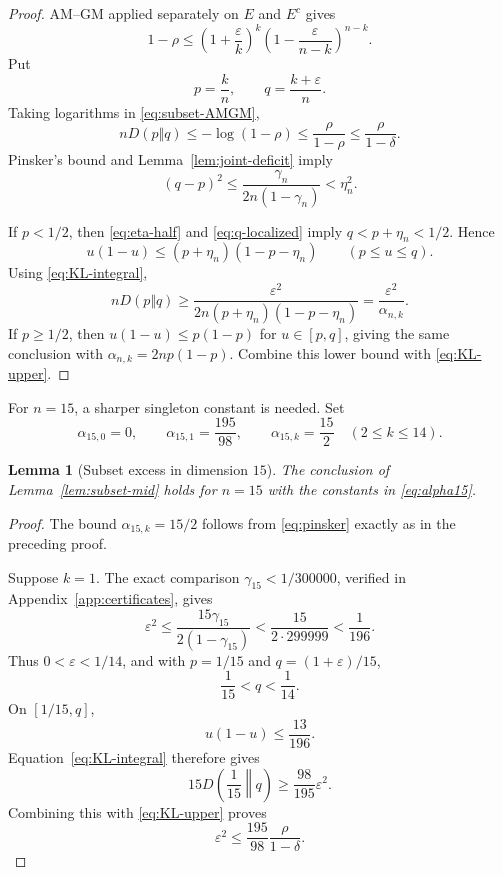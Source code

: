 \documentclass[11pt,a4paper]{article}
\numberwithin{equation}{section}
\newtheorem{lemma}[theorem]{Lemma}
\theoremstyle{definition}
\newcommand{\1}{\mathbf{1}}
\newcommand{\eps}{\varepsilon}
\begin{document}
\begin{proof}
AM--GM applied separately on $E$ and $E^c$ gives
\begin{equation}\label{eq:subset-AMGM}
 1-\rho
 \le
 \left(1+\frac{\eps}{k}\right)^k
 \left(1-\frac{\eps}{n-k}\right)^{n-k}.
\end{equation}
Put
\[
 p=\frac{k}{n},
 \qquad
 q=\frac{k+\eps}{n}.
\]
Taking logarithms in \eqref{eq:subset-AMGM},
\begin{equation}\label{eq:KL-upper}
 nD(p\Vert q)\le-\log(1-\rho)
 \le\frac{\rho}{1-\rho}
 \le\frac{\rho}{1-\delta}.
\end{equation}
Pinsker's bound and Lemma~\ref{lem:joint-deficit} imply
\begin{equation}\label{eq:q-localized}
 (q-p)^2
 \le\frac{\gamma_n}{2n(1-\gamma_n)}
 <\eta_n^2.
\end{equation}

If $p<1/2$, then \eqref{eq:eta-half} and \eqref{eq:q-localized} imply $q<p+\eta_n<1/2$.  Hence
\[
 u(1-u)\le(p+\eta_n)(1-p-\eta_n)
 \qquad(p\le u\le q).
\]
Using \eqref{eq:KL-integral},
\[
 nD(p\Vert q)
 \ge\frac{\eps^2}
 {2n(p+\eta_n)(1-p-\eta_n)}
 =\frac{\eps^2}{\alpha_{n,k}}.
\]
If $p\ge1/2$, then $u(1-u)\le p(1-p)$ for $u\in[p,q]$, giving the same conclusion with $\alpha_{n,k}=2np(1-p)$.  Combine this lower bound with \eqref{eq:KL-upper}.
\end{proof}

For $n=15$, a sharper singleton constant is needed.  Set
\begin{equation}\label{eq:alpha15}
 \alpha_{15,0}=0,
 \qquad
 \alpha_{15,1}=\frac{195}{98},
 \qquad
 \alpha_{15,k}=\frac{15}{2}\quad(2\le k\le14).
\end{equation}

\begin{lemma}[Subset excess in dimension $15$]\label{lem:subset15}
The conclusion of Lemma~\ref{lem:subset-mid} holds for $n=15$ with the constants in \eqref{eq:alpha15}.
\end{lemma}

\begin{proof}
The bound $\alpha_{15,k}=15/2$ follows from \eqref{eq:pinsker} exactly as in the preceding proof.

Suppose $k=1$.  The exact comparison $\gamma_{15}<1/300000$, verified in Appendix~\ref{app:certificates}, gives
\[
 \eps^2
 \le\frac{15\gamma_{15}}{2(1-\gamma_{15})}
 <\frac{15}{2\cdot299999}<\frac1{196}.
\]
Thus $0<\eps<1/14$, and with $p=1/15$ and $q=(1+\eps)/15$,
\[
 \frac1{15}<q<\frac1{14}.
\]
On $[1/15,q]$,
\[
 u(1-u)\le\frac{13}{196}.
\]
Equation~\eqref{eq:KL-integral} therefore gives
\[
 15D\left(\frac1{15}\middle\Vert q\right)
 \ge\frac{98}{195}\eps^2.
\]
Combining this with \eqref{eq:KL-upper} proves
\[
 \eps^2\le\frac{195}{98}\frac{\rho}{1-\delta}.
\]
\end{proof}
\end{document}

